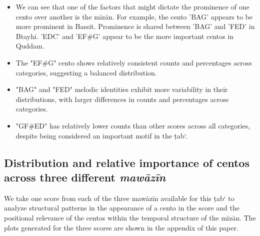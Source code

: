\documentclass{article}
\begin{document}
\begin{itemize}
  \item We can see that one of the factors that might dictate the prominence of one cento over another is the mīzān. For example, the cento 'BAG' appears to be more prominent in Bassit. Prominence is shared between 'BAG' and 'FED' in Btayhi. 'EDC' and 'EF\#G' appear to be the more important centos in Quddam.

  \item The "EF\#G" cento shows relatively consistent counts and percentages across categories, suggesting a balanced distribution.
  \item "BAG" and "FED" melodic identities exhibit more variability in their distributions, with larger differences in counts and percentages across categories.
  \item "GF\#ED" has relatively lower counts than other scores across all categories, despite being considered an important motif in the ṭab‘.
\end{itemize}

\subsection{Distribution and relative importance of centos across three different \textit{mawāzīn}}

We take one score from each of the three mawāzīn available for this ṭab‘ to analyze structural patterns in the appearance of a cento in the score and the positional relevance of the centos within the temporal structure of the mīzān. The plots generated for the three scores are shown in the appendix of this paper.
\end{document}

